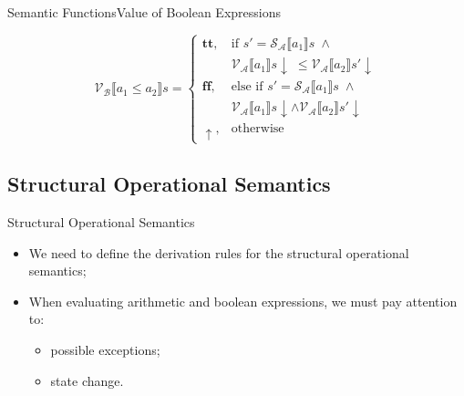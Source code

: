 \documentclass{beamer}
\newcommand{\sem}[2]{\mathcal{#1} \llbracket #2 \rrbracket}
\newcommand{\tr}{\mathbf{tt}}
\newcommand{\ff}{\mathbf{ff}}
\newcommand{\undefined}{\uparrow}
\newcommand{\defined}{\!\downarrow}
\begin{document}
\begin{frame}{Semantic Functions}{Value of Boolean Expressions}
\begin{overprint}
        \begin{equation*}
            \sem{V_B}{a_1 \leq a_2}s =
            \begin{cases}
                \tr,
                 & \mbox{if } s' = \sem{S_A}{a_1}s \;\wedge                  \\
                 & \sem{V_A}{a_1}s \defined \;\leq \sem{V_A}{a_2}s' \defined \\
                \ff,
                 & \mbox{else if } s' = \sem{S_A}{a_1}s \;\wedge             \\
                 & \sem{V_A}{a_1}s \defined \wedge \sem{V_A}{a_2}s' \defined \\
                \undefined,
                 & \mbox{otherwise}
            \end{cases}
        \end{equation*}
    \end{overprint}

\end{frame}

\subsection{Structural Operational Semantics}
\begin{frame}{Structural Operational Semantics}

    \begin{itemize}
        \item We need to define the derivation rules for the structural operational semantics;
        \item When evaluating arithmetic and boolean expressions, we must pay attention to:
              \begin{itemize}
                  \item possible exceptions;
                  \item state change.
              \end{itemize}
    \end{itemize}

\end{frame}
\end{document}
